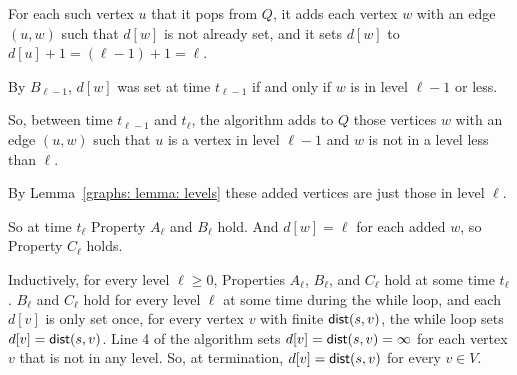 \documentclass[11pt]{article}
\begin{document}
\begin{longFormProof}
\begin{block}
    \step\label{graphs: step: d} For each such vertex $u$ that it pops from $Q$,
    it adds each vertex $w$ with an edge $(u, w)$ such that $d[w]$ is not already set,
    and it sets $d[w]$ to $d[u]+1 = (\ell-1) + 1 = \ell$.

    \step By $B_{\ell-1}$, $d[w]$ was set at time $t_{\ell-1}$ if and only if $w$ is in level $\ell-1$ or less.

    \step So, between time $t_{\ell-1}$ and $t_{\ell}$,
    the algorithm adds to $Q$ those vertices $w$ with an edge $(u,w)$ such that $u$ is a vertex in level $\ell-1$
    and $w$ is not in a level less than $\ell$.

    \step By Lemma~\ref{graphs: lemma: levels} these added vertices are just those in level $\ell$.

    \step So at time $t_\ell$ Property $A_\ell$ and $B_\ell$ hold.  And $d[w] = \ell$ for each added $w$,
    so Property $C_\ell$ holds.
  \end{block}
  \step Inductively, for every level $\ell\ge 0$, Properties $A_\ell$, $B_\ell$, and $C_\ell$ hold at some time $t_\ell$.
  \step $B_\ell$ and $C_\ell$ hold for every level $\ell$ at some time during the while loop,
  and each $d[v]$ is only set once, for every vertex $v$ with finite $\operatorname{\sf dist}(s, v)$, the while loop sets $d[v] = \operatorname{\sf dist}(s, v)$.
  \step Line 4 of the algorithm sets $d[v] = \operatorname{\sf dist}(s, v) = \infty$ for each vertex $v$ that is not in any level.
  \step So, at termination, $d[v] = \operatorname{\sf dist}(s, v)$ for every $v\in V$.
\end{longFormProof}



\end{document}
